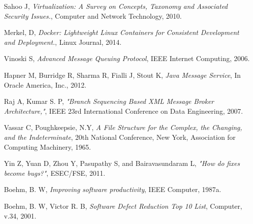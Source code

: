 \documentclass[a4paper,11pt,twoside]{report}
\begin{document}
\begin{thebibliography}{1}
	   Sahoo J, {\em Virtualization: A Survey on Concepts, Taxonomy and Associated Security Issues.}, Computer and Network Technology, 2010.
  
    Merkel, D, {\em Docker: Lightweight Linux Containers for Consistent Development and Deployment.}, Linux Journal, 2014.
	
	 Vinoski S, {\em Advanced Message Queuing Protocol}, IEEE Internet Computing, 2006. 

     Hapner M, Burridge R, Sharma R, Fialli J, Stout K, {\em Java Message Service}, In Oracle America, Inc., 2012.

 Raj A, Kumar S. P, {\em "Branch Sequencing Based XML Message Broker Architecture,"}, IEEE 23rd International Conference on Data Engineering, 2007.  

Vassar C, Poughkeepsie, N.Y, \textit{A File Structure for the Complex, the Changing, and the Indeterminate}, 20th National Conference, New York, Association for Computing Machinery, 1965.

Yin Z, Yuan D, Zhou Y, Pasupathy S, and Bairavasundaram L, \textit{"How
do fixes become bugs?"}, ESEC/FSE, 2011.

Boehm, B. W, \textit{Improving software productivity}, IEEE Computer, 1987a.

 Boehm, B. W, Victor R. B, \textit{Software Defect Reduction Top 10 List}, Computer, v.34, 2001.


\end{thebibliography} 
\end{document}
